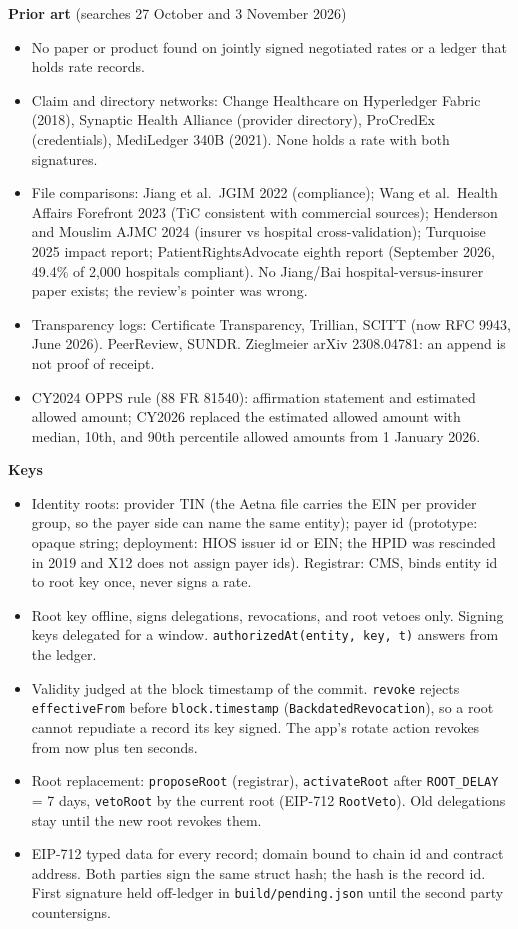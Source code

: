 \textbf{Prior art} (searches 27 October and 3 November 2026)
\begin{itemize}
\item No paper or product found on jointly signed negotiated rates or a ledger that holds rate records.
\item Claim and directory networks: Change Healthcare on Hyperledger Fabric (2018), Synaptic Health Alliance (provider directory), ProCredEx (credentials), MediLedger 340B (2021). None holds a rate with both signatures.
\item File comparisons: Jiang et al.\ JGIM 2022 (compliance); Wang et al.\ Health Affairs Forefront 2023 (TiC consistent with commercial sources); Henderson and Mouslim AJMC 2024 (insurer vs hospital cross-validation); Turquoise 2025 impact report; PatientRightsAdvocate eighth report (September 2026, 49.4\% of 2,000 hospitals compliant). No Jiang/Bai hospital-versus-insurer paper exists; the review's pointer was wrong.
\item Transparency logs: Certificate Transparency, Trillian, SCITT (now RFC 9943, June 2026). PeerReview, SUNDR. Zieglmeier arXiv 2308.04781: an append is not proof of receipt.
\item CY2024 OPPS rule (88 FR 81540): affirmation statement and estimated allowed amount; CY2026 replaced the estimated allowed amount with median, 10th, and 90th percentile allowed amounts from 1 January 2026.
\end{itemize}

\textbf{Keys}
\begin{itemize}
\item Identity roots: provider TIN (the Aetna file carries the EIN per provider group, so the payer side can name the same entity); payer id (prototype: opaque string; deployment: HIOS issuer id or EIN; the HPID was rescinded in 2019 and X12 does not assign payer ids). Registrar: CMS, binds entity id to root key once, never signs a rate.
\item Root key offline, signs delegations, revocations, and root vetoes only. Signing keys delegated for a window. \texttt{authorizedAt(entity, key, t)} answers from the ledger.
\item Validity judged at the block timestamp of the commit. \texttt{revoke} rejects \texttt{effectiveFrom} before \texttt{block.timestamp} (\texttt{BackdatedRevocation}), so a root cannot repudiate a record its key signed. The app's rotate action revokes from now plus ten seconds.
\item Root replacement: \texttt{proposeRoot} (registrar), \texttt{activateRoot} after \texttt{ROOT\_DELAY} = 7 days, \texttt{vetoRoot} by the current root (EIP-712 \texttt{RootVeto}). Old delegations stay until the new root revokes them.
\item EIP-712 typed data for every record; domain bound to chain id and contract address. Both parties sign the same struct hash; the hash is the record id. First signature held off-ledger in \texttt{build/pending.json} until the second party countersigns.
\end{itemize}

